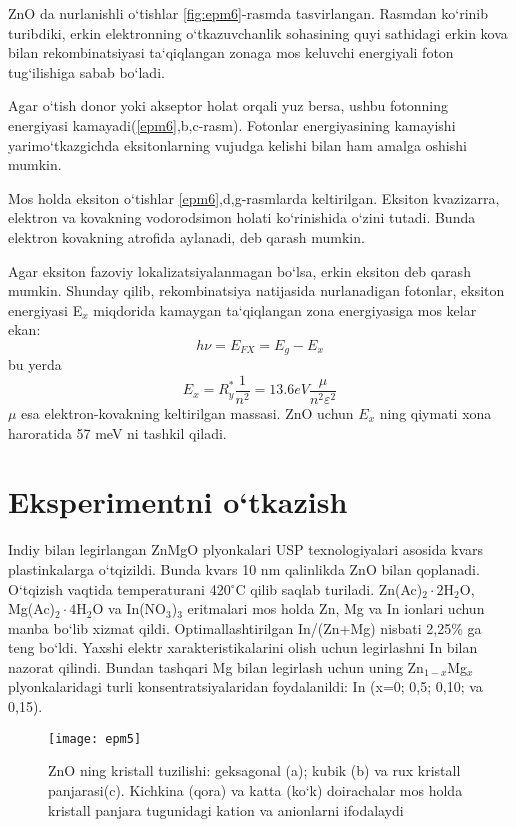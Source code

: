 \documentclass[14pt]{scrarticle}
\begin{document}
	ZnO da nurlanishli o`tishlar \ref{fig:epm6}-rasmda tasvirlangan. 
	Rasmdan ko`rinib turibdiki, erkin elektronning o`tkazuvchanlik sohasining quyi sathidagi erkin kova bilan rekombinatsiyasi ta`qiqlangan zonaga mos keluvchi energiyali foton tug`ilishiga sabab bo`ladi. 
	
	Agar o`tish donor yoki akseptor holat orqali yuz  bersa, ushbu fotonning energiyasi kamayadi(\ref{epm6},b,c-rasm). Fotonlar energiyasining kamayishi yarimo`tkazgichda eksitonlarning vujudga kelishi bilan ham amalga oshishi mumkin. 
	
	Mos holda eksiton o`tishlar \ref{epm6},d,g-rasmlarda keltirilgan. Eksiton kvazizarra, elektron va kovakning vodorodsimon holati ko`rinishida o`zini tutadi. Bunda elektron kovakning atrofida aylanadi, deb qarash mumkin. 
	
	Agar eksiton fazoviy lokalizatsiyalanmagan bo`lsa, erkin eksiton deb qarash mumkin. Shunday qilib, rekombinatsiya natijasida nurlanadigan fotonlar, eksiton energiyasi E$_{x}$ miqdorida kamaygan ta`qiqlangan zona energiyasiga mos kelar ekan:
	\begin{equation}
	h\nu=E_{FX}=E_{g}-E_{x}
	\end{equation}
	bu yerda 
	\begin{equation}
	E_{x}=R_{y}^{*}\frac{1}{n^{2}}=13.6 eV\frac{\mu}{n^{2}\varepsilon^{2}}
	\end{equation}
	$\mu$ esa elektron-kovakning keltirilgan massasi. ZnO uchun $E_{x}$ ning qiymati xona haroratida 57 meV ni tashkil qiladi. 
	 \section{Eksperimentni o`tkazish}
	Indiy bilan legirlangan ZnMgO plyonkalari USP texnologiyalari asosida kvars plastinkalarga o`tqizildi. Bunda kvars 10 nm qalinlikda ZnO bilan qoplanadi. O`tqizish vaqtida temperaturani 420$^{\circ}$C qilib saqlab turiladi. Zn(Ac)$_{2}\cdot 2$H$_{2}$O, Mg(Ac)$_{2}\cdot 4$H$_{2}$O va In(NO$_{3}$)$_{3}$ eritmalari mos holda Zn, Mg va In ionlari uchun manba bo`lib xizmat qildi. 
	Optimallashtirilgan In/(Zn+Mg) nisbati 2,25\% ga teng bo`ldi. Yaxshi elektr xarakteristikalarini olish uchun legirlashni In bilan nazorat qilindi. Bundan tashqari Mg bilan legirlash uchun uning Zn$_{1-x}$Mg$_{x}$ plyonkalaridagi turli konsentratsiyalaridan foydalanildi: In (x=0; 0,5; 0,10; va 0,15). 
	
	
\begin{figure*}[h]
	\centering
	\texttt{[image: epm5]}
	\caption{ZnO ning kristall tuzilishi: geksagonal (a); kubik (b) va rux kristall panjarasi(c). Kichkina (qora) va katta (ko`k) doirachalar mos holda kristall panjara tugunidagi kation va anionlarni ifodalaydi }
	\label{fig:epm5}
\end{figure*}
	
\end{document}
